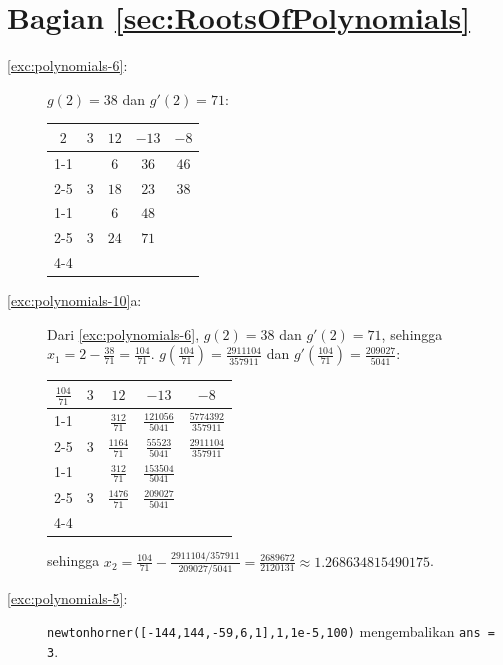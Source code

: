 \section*{Bagian \ref{sec:RootsOfPolynomials}}
\begin{description}
\item [{\ref{exc:polynomials-6}:}] $g(2)=38$ dan $g'(2)=71$:

\begin{center}
\begin{tabular}{ccccc}
\multicolumn{1}{c|}{$2$} & $3$ & $12$ & $-13$ & $-8$\tabularnewline
\cline{1-1}
 &  & $6$ & $36$ & $46$\tabularnewline
\cline{2-5}
\multicolumn{1}{c|}{$2$} & $3$ & $18$ & \multicolumn{1}{c|}{$23$} & \multicolumn{1}{c|}{$38$}\tabularnewline
\cline{1-1}\cline{5-5}
 &  & $6$ & $48$ & \tabularnewline
\cline{2-5}
 & $3$ & \multicolumn{1}{c|}{$24$} & \multicolumn{1}{c|}{$71$} & \tabularnewline
\cline{4-4}
\end{tabular}
\par\end{center}
\item [{\ref{exc:polynomials-10}a:}] Dari \ref{exc:polynomials-6}, $g(2)=38$
dan $g'(2)=71$, sehingga $x_{1}=2-\frac{38}{71}=\frac{104}{71}$.
$g(\frac{104}{71})=\frac{2911104}{357911}$ dan $g'(\frac{104}{71})=\frac{209027}{5041}$:

\begin{center}
\setlength{\extrarowheight}{5pt}%
\begin{tabular}{ccccc}
\multicolumn{1}{c|}{$\frac{104}{71}$} & $3$ & $12$ & $-13$ & $-8$\tabularnewline
\cline{1-1}
 &  & $\frac{312}{71}$ & $\frac{121056}{5041}$ & $\frac{5774392}{357911}$\tabularnewline
\cline{2-5}
\multicolumn{1}{c|}{$\frac{104}{71}$} & $3$ & $\frac{1164}{71}$ & \multicolumn{1}{c|}{$\frac{55523}{5041}$} & \multicolumn{1}{c|}{$\frac{2911104}{357911}$}\tabularnewline
\cline{1-1}\cline{5-5}
 &  & $\frac{312}{71}$ & $\frac{153504}{5041}$ & \tabularnewline
\cline{2-5}
 & $3$ & \multicolumn{1}{c|}{$\frac{1476}{71}$} & \multicolumn{1}{c|}{$\frac{209027}{5041}$} & \tabularnewline
\cline{4-4}
\end{tabular}
\par\end{center}

sehingga $x_{2}=\frac{104}{71}-\frac{2911104/357911}{209027/5041}=\frac{2689672}{2120131}\approx1.268634815490175$.
\item [{\ref{exc:polynomials-5}:}] \texttt{newtonhorner({[}-144,144,-59,6,1{]},1,1e-5,100)}
mengembalikan \texttt{ans = 3}.


\end{description}

